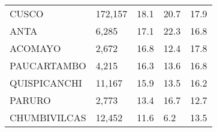 \begin{tabular}{lllll}
	\cellcolor[HTML]{FF5050}CUSCO                                  & 172,157                                                               & 18.1                                                                             & 20.7                                                                        & 17.9                                                                                \\
	\cellcolor[HTML]{FF5050}ANTA                                   & 6,285                                                                 & 17.1                                                                             & 22.3                                                                        & 16.8                                                                                \\
	\cellcolor[HTML]{FF5050}ACOMAYO                                & 2,672                                                                 & 16.8                                                                             & 12.4                                                                        & 17.8                                                                                \\
	\cellcolor[HTML]{FF5050}PAUCARTAMBO                            & 4,215                                                                 & 16.3                                                                             & 13.6                                                                        & 16.8                                                                                \\
	\cellcolor[HTML]{FF5050}QUISPICANCHI                           & 11,167                                                                & 15.9                                                                             & 13.5                                                                        & 16.2                                                                                \\
	\cellcolor[HTML]{FF5050}PARURO                                 & 2,773                                                                 & 13.4                                                                             & 16.7                                                                        & 12.7                                                                                \\
	\cellcolor[HTML]{FF5050}CHUMBIVILCAS                           & 12,452                                                                & 11.6                                                                             & 6.2                                                                         & 13.5                                                                                \\

\end{tabular}
